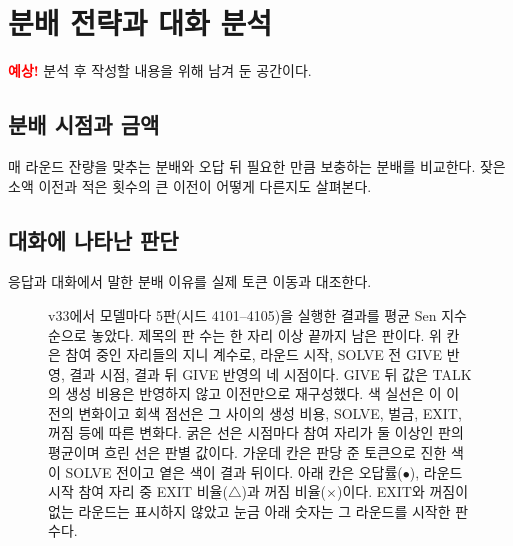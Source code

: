 \section{분배 전략과 대화 분석}\label{sec:strategies}

\noindent\textcolor{red}{\textbf{예상!}} 분석 후 작성할 내용을 위해 남겨 둔 공간이다.

\subsection{분배 시점과 금액}

매 라운드 잔량을 맞추는 분배와 오답 뒤 필요한 만큼 보충하는 분배를 비교한다.
잦은 소액 이전과 적은 횟수의 큰 이전이 어떻게 다른지도 살펴본다.

\subsection{대화에 나타난 판단}

응답과 대화에서 말한 분배 이유를 실제 토큰 이동과 대조한다.

\begin{figure}[t]
\centering
\resizebox{\textwidth}{!}{}
\caption{v33에서 모델마다 5판(시드 4101--4105)을 실행한 결과를 평균 Sen 지수 순으로 놓았다. 제목의 판 수는 한 자리 이상 끝까지 남은 판이다. 위 칸은 참여 중인 자리들의 지니 계수로, 라운드 시작, SOLVE 전 GIVE 반영, 결과 시점, 결과 뒤 GIVE 반영의 네 시점이다. GIVE 뒤 값은 TALK의 생성 비용은 반영하지 않고 이전만으로 재구성했다. 색 실선은 이 이전의 변화이고 회색 점선은 그 사이의 생성 비용, SOLVE, 벌금, EXIT, 꺼짐 등에 따른 변화다. 굵은 선은 시점마다 참여 자리가 둘 이상인 판의 평균이며 흐린 선은 판별 값이다. 가운데 칸은 판당 준 토큰으로 진한 색이 SOLVE 전이고 옅은 색이 결과 뒤이다. 아래 칸은 오답률($\bullet$), 라운드 시작 참여 자리 중 EXIT 비율($\triangle$)과 꺼짐 비율($\times$)이다. EXIT와 꺼짐이 없는 라운드는 표시하지 않았고 눈금 아래 숫자는 그 라운드를 시작한 판 수다.}
\label{fig:arena-gini}
\end{figure}
